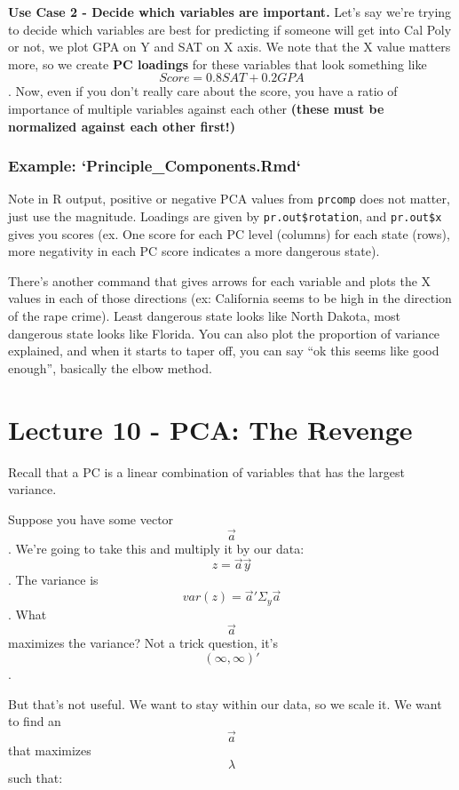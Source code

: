 \documentclass[]{article}
\begin{document}
\textbf{Use Case 2 - Decide which variables are important.} Let's say
we're trying to decide which variables are best for predicting if
someone will get into Cal Poly or not, we plot GPA on Y and SAT on X
axis. We note that the X value matters more, so we create \textbf{PC
loadings} for these variables that look something like
\[Score = 0.8SAT + 0.2GPA\]. Now, even if you don't really care about
the score, you have a ratio of importance of multiple variables against
each other \textbf{(these must be normalized against each other first!)}

\hypertarget{example-principle_components.rmd}{%
\subsubsection{Example:
`Principle\_Components.Rmd`}\label{example-principle_components.rmd}}

Note in R output, positive or negative PCA values from \texttt{prcomp}
does not matter, just use the magnitude. Loadings are given by
\texttt{pr.out\$rotation}, and \texttt{pr.out\$x} gives you scores (ex.
One score for each PC level (columns) for each state (rows), more
negativity in each PC score indicates a more dangerous state).

There's another command that gives arrows for each variable and plots
the X values in each of those directions (ex: California seems to be
high in the direction of the rape crime). Least dangerous state looks
like North Dakota, most dangerous state looks like Florida. You can also
plot the proportion of variance explained, and when it starts to taper
off, you can say ``ok this seems like good enough'', basically the elbow
method.

\hypertarget{lecture-10---pca-the-revenge}{%
\section{Lecture 10 - PCA: The
Revenge}\label{lecture-10---pca-the-revenge}}

Recall that a PC is a linear combination of variables that has the
largest variance.

Suppose you have some vector \[\vec{a}\]. We're going to take this and
multiply it by our data: \[z = \vec{a}\vec{y}\]. The variance is
\[var(z) = \vec{a}'\Sigma_y\vec{a}\]. What \[\vec{a}\] maximizes the
variance? Not a trick question, it's \[(\infty, \infty)'\].

But that's not useful. We want to stay within our data, so we scale it.
We want to find an \[\vec{a}\] that maximizes \[\lambda\] such that:
\end{document}
